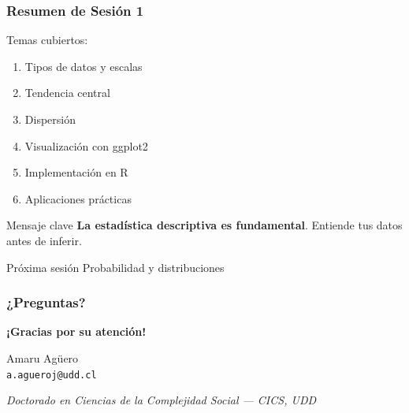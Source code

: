 \documentclass[aspectratio=169,11pt]{beamer}
\begin{document}
\begin{frame}[fragile]
\frametitle{Resumen de Sesión 1}
\small

\begin{exampleblock}{Temas cubiertos:}
  \begin{enumerate}
    \item Tipos de datos y escalas
    \item Tendencia central
    \item Dispersión
    \item Visualización con ggplot2
    \item Implementación en R
    \item Aplicaciones prácticas
  \end{enumerate}
\end{exampleblock}

\pause

\begin{alertblock}{Mensaje clave}
  \textbf{La estadística descriptiva es fundamental}. Entiende tus datos antes de inferir.
\end{alertblock}

\pause

\begin{block}{Próxima sesión}
  Probabilidad y distribuciones
\end{block}
\end{frame}

\begin{frame}[fragile]
\frametitle{¿Preguntas?}

\vspace{2cm}

\begin{center}
  \Large
  \textbf{¡Gracias por su atención!}

  \vspace{1cm}

  \normalsize
  Amaru Agüero \\
  \texttt{a.agueroj@udd.cl}

  \vspace{1cm}

  \textit{Doctorado en Ciencias de la Complejidad Social — CICS, UDD}
\end{center}

\end{frame}
\end{document}
